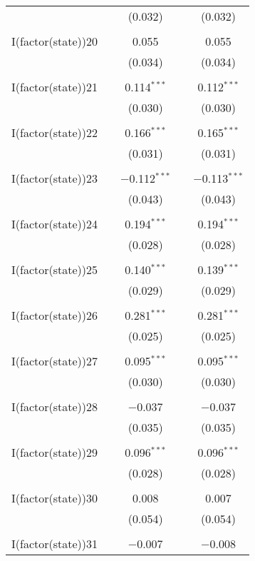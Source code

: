 \begin{table}[!htbp]
\begin{tabular}{@{\extracolsep{5pt}}lcccc}
  &  & (0.032) &  & (0.032) \\ 
  & & & & \\ 
 I(factor(state))20 &  & 0.055 &  & 0.055 \\ 
  &  & (0.034) &  & (0.034) \\ 
  & & & & \\ 
 I(factor(state))21 &  & 0.114$^{***}$ &  & 0.112$^{***}$ \\ 
  &  & (0.030) &  & (0.030) \\ 
  & & & & \\ 
 I(factor(state))22 &  & 0.166$^{***}$ &  & 0.165$^{***}$ \\ 
  &  & (0.031) &  & (0.031) \\ 
  & & & & \\ 
 I(factor(state))23 &  & $-$0.112$^{***}$ &  & $-$0.113$^{***}$ \\ 
  &  & (0.043) &  & (0.043) \\ 
  & & & & \\ 
 I(factor(state))24 &  & 0.194$^{***}$ &  & 0.194$^{***}$ \\ 
  &  & (0.028) &  & (0.028) \\ 
  & & & & \\ 
 I(factor(state))25 &  & 0.140$^{***}$ &  & 0.139$^{***}$ \\ 
  &  & (0.029) &  & (0.029) \\ 
  & & & & \\ 
 I(factor(state))26 &  & 0.281$^{***}$ &  & 0.281$^{***}$ \\ 
  &  & (0.025) &  & (0.025) \\ 
  & & & & \\ 
 I(factor(state))27 &  & 0.095$^{***}$ &  & 0.095$^{***}$ \\ 
  &  & (0.030) &  & (0.030) \\ 
  & & & & \\ 
 I(factor(state))28 &  & $-$0.037 &  & $-$0.037 \\ 
  &  & (0.035) &  & (0.035) \\ 
  & & & & \\ 
 I(factor(state))29 &  & 0.096$^{***}$ &  & 0.096$^{***}$ \\ 
  &  & (0.028) &  & (0.028) \\ 
  & & & & \\ 
 I(factor(state))30 &  & 0.008 &  & 0.007 \\ 
  &  & (0.054) &  & (0.054) \\ 
  & & & & \\ 
 I(factor(state))31 &  & $-$0.007 &  & $-$0.008 \\ 

\end{tabular}
\end{table}
